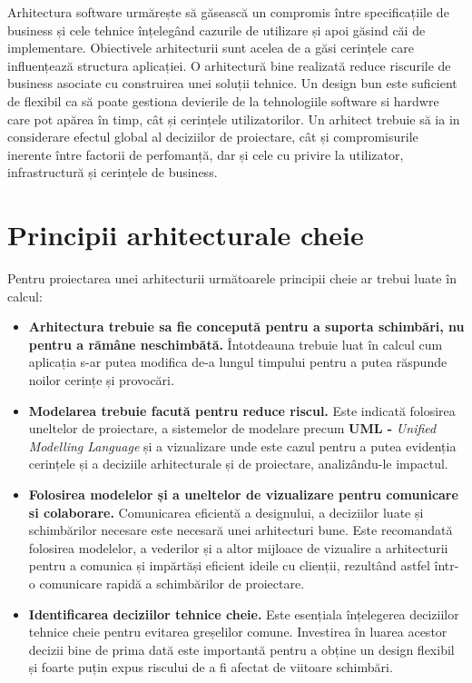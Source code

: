 \documentclass[12pt, a4paper, oneside, romanian]{teza-upb}
\begin{document}
Arhitectura software urmărește să găsească un compromis între specificațiile de business și cele tehnice înțelegând cazurile de utilizare și apoi găsind căi de implementare. Obiectivele arhitecturii sunt acelea de a găsi cerințele care influențează structura aplicației. O arhitectură bine realizată reduce riscurile de business asociate cu construirea unei soluții tehnice. Un design bun este suficient de flexibil ca să poate gestiona devierile de la tehnologiile software si hardwre care pot apărea în timp, cât și cerințele utilizatorilor. Un arhitect trebuie să ia in considerare efectul global al deciziilor de proiectare, cât și compromisurile inerente între factorii de perfomanță, dar și cele cu privire la utilizator, infrastructură și cerințele de business.

\newpage
\section{Principii arhitecturale cheie}
Pentru proiectarea unei arhitecturii următoarele principii cheie ar trebui luate în calcul:
\begin{itemize}
	\item \textbf{Arhitectura trebuie sa fie concepută pentru a suporta schimbări, nu pentru a rămâne neschimbătă.} Întotdeauna trebuie luat în calcul cum aplicația s-ar putea modifica de-a lungul timpului pentru a putea răspunde noilor cerințe și provocări.
	\item \textbf{Modelarea trebuie facută pentru reduce riscul.} Este indicată folosirea uneltelor de proiectare, a sistemelor de modelare precum \textbf{UML -} \emph{Unified Modelling Language} și a vizualizare unde este cazul pentru a putea evidenția cerințele și a deciziile arhitecturale și de proiectare, analizându-le impactul.
	\item \textbf{Folosirea modelelor și a uneltelor de vizualizare pentru comunicare si colaborare.} Comunicarea eficientă a designului, a deciziilor luate și schimbărilor necesare este necesară unei arhitecturi bune. Este recomandată folosirea modelelor, a vederilor și a altor mijloace de vizualire a arhitecturii pentru a comunica și impărtăși eficient ideile cu clienții, rezultând astfel într-o comunicare rapidă a schimbărilor de proiectare.
	\item \textbf{Identificarea deciziilor tehnice cheie.} Este esențiala înțelegerea deciziilor tehnice cheie pentru evitarea greșelilor comune. Investirea în luarea acestor decizii bine de prima dată este importantă pentru a obține un design flexibil și foarte puțin expus riscului de a fi afectat de viitoare schimbări.
\end{itemize}
\end{document}
